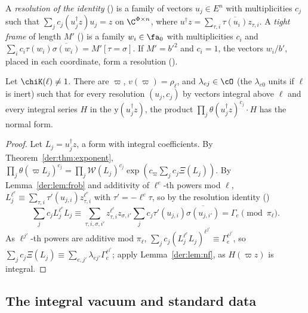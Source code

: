 A \emph{resolution of the identity} () is a family of vectors $u_j\in E^n$
with multiplicities $c_j$ such that $\sum_jc_j(u_j^\dagger z)u_j=z$ on $\C^{\Phi\times n}$, where
$u^\dagger z=\sum_{\tau,i}\overline{\tau(u_i)}z_{\tau,i}$. A \emph{tight frame} of length $M'$
() is a family $w_i\in\fa_0$ with multiplicities $c_i$ and
$\sum_ic_i\tau(w_i)\overline{\sigma(w_i)}=M'[\tau=\sigma]$. If $M'=b'^2$ and $c_i=1$, the vectors
$w_i/b'$, placed in each coordinate, form a resolution ().

\begin{proposition}
\label{der:prop:thetaprod}
Let $\chiK(\ell)\ne1$. There are $\varpi$, $v(\varpi)=\rho_\ell$, and $\lambda_{ej}\in\cO$ (the
$\lambda_{e0}$ units if $\ell$ is inert) such that for every resolution $(u_j,c_j)$ by vectors
integral above $\ell$ and every integral series $H$ in the $\mathrm y(u_j^\dagger z)$, the product
$\prod_j\theta(u_j^\dagger z)^{c_j}\cdot H$ has the normal form.
\end{proposition}

\begin{proof}
Let $L_j=u_j^\dagger z$, a form with integral coefficients. By Theorem~\ref{der:thm:exponent},
$\prod_j\theta(\varpi L_j)^{c_j}=\prod_j\mathcal W(L_j)^{c_j}\exp(c_\varpi\sum_jc_j\Xi(L_j))$. By
Lemma~\ref{der:lem:frob} and additivity of $\ell^e$-th powers mod $\ell$,
$L_j^{\ell^e}\equiv\sum_{\tau,i}\tau'(u_{j,i})z_{\tau,i}^{\ell^e}$ with $\tau'=-\ell^e\tau$, so by the
resolution identity ()
\[
\textstyle\sum_jc_jL_j^{\ell^e}L_j\equiv\sum_{\tau,i,\sigma,i'}z_{\tau,i}^{\ell^e}z_{\sigma,i'}
\sum_jc_j\tau'(u_{j,i})\overline{\sigma(u_{j,i'})}=\Gamma_e\pmod{\pi_\ell}.
\]
As $\ell^{j'}$-th powers are additive mod $\pi_\ell$,
$\sum_jc_j(L_j^{\ell^e}L_j)^{\ell^{j'}}\equiv\Gamma_e^{\ell^{j'}}$, so
$\sum_jc_j\Xi(L_j)\equiv\sum_{e,j'}\lambda_{ej'}\Gamma_e^{\ell^{j'}}$; apply Lemma~\ref{der:lem:nf}, as
$H(\varpi z)$ is integral.
\end{proof}

\subsection{The integral vacuum and standard data}\label{der:sec:vacuum}

